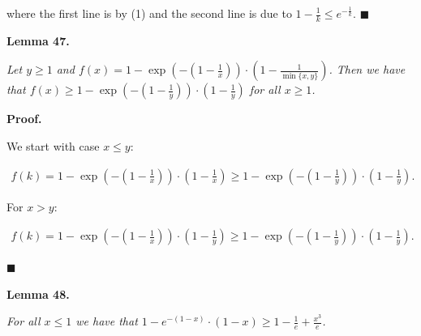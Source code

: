 where the first line is by (1) and the second line is due to $1-\frac{1}{k}\leq e^{-\frac{1}{k}}$.
\ensuremath{\blacksquare}\par






\par\medskip\noindent\textbf{\textbf{Lemma 47}\textbf{.}}\par



\emph{Let $y\geq 1$ and $f(x)=1-\exp\left(-\left(1-\frac{1}{x}\right)\right)\cdot\left(1-\frac{1}{\min\{x,y\}}\right)$.
Then we have that
$f(x)\geq 1-\exp\left(-\left(1-\frac{1}{y}\right)\right)\cdot\left(1-\frac{1}{y}\right)$ for all $x\geq 1$.}\par






\par\medskip\noindent\textbf{Proof.}\par



We start with case $x\leq y$:\par


\[\begin{gathered}
\displaystyle f(k)=1-\exp\left(-\left(1-\frac{1}{x}\right)\right)\cdot\left(1-\frac{1}{x}\right)\geq 1-\exp\left(-\left(1-\frac{1}{y}\right)\right)\cdot\left(1-\frac{1}{y}\right).
\end{gathered}\]


For $x>y$:\par


\[\begin{gathered}
\displaystyle f(k)=1-\exp\left(-\left(1-\frac{1}{x}\right)\right)\cdot\left(1-\frac{1}{y}\right)\geq 1-\exp\left(-\left(1-\frac{1}{y}\right)\right)\cdot\left(1-\frac{1}{y}\right).
\end{gathered}\]


\ensuremath{\blacksquare}\par






\par\medskip\noindent\textbf{\textbf{Lemma 48}\textbf{.}}\par



\emph{For all $x\leq 1$ we have that $1-e^{-(1-x)}\cdot(1-x)\geq 1-\frac{1}{e}+\frac{x^{3}}{e}$.}\par



